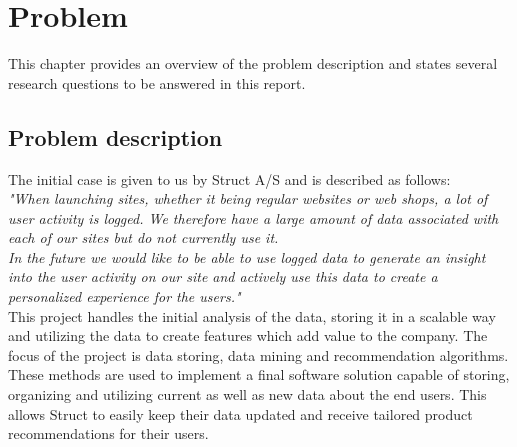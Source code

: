
\chapter{Problem} %

\label{Chapter1} %

This chapter provides an overview of the problem description and states several research questions to be answered in this report.

\section{Problem description}

The initial case is given to us by Struct A/S and is described as follows: \\

\textit{"When launching sites, whether it being regular websites or web shops, a lot of user activity is logged. We therefore have a large amount of data associated with each of our sites but do not currently use it.} \\
\textit{In the future we would like to be able to use logged data to generate an insight into the user activity on our site and actively use this data to create a personalized experience for the users."} \\

This project handles the initial analysis of the data, storing it in a scalable way and utilizing the data to create features which add value to the company. The focus of the project is data storing, data mining and recommendation algorithms. These methods are used to implement a final software solution capable of storing, organizing and utilizing current as well as new data about the end users. This allows Struct to easily keep their data updated and receive tailored product recommendations for their users.

